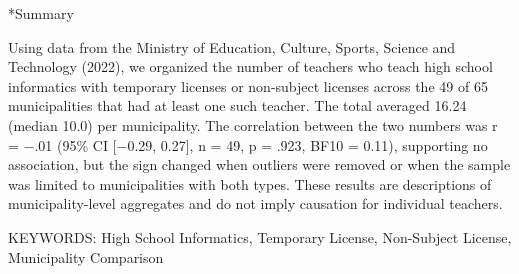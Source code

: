 \documentclass[a4paper,10pt,twocolumn]{ltjsarticle}
\makeatletter
\renewcommand{\section}{\@startsection{section}{1}{\z@}{1.1\Cvs \@plus.4\Cdp \@minus.2\Cdp}{.5\Cvs \@plus.2\Cdp}{\normalfont\gtfamily\bfseries\large}}
\makeatother
\begin{document}
\section*{Summary}
{\footnotesize\setlength{\parindent}{0pt}Using data from the Ministry of Education, Culture, Sports, Science and Technology (2022), we organized the number of teachers who teach high school informatics with temporary licenses or non-subject licenses across the 49 of 65 municipalities that had at least one such teacher. The total averaged 16.24 (median 10.0) per municipality. The correlation between the two numbers was r = −.01 (95\% CI [−0.29, 0.27], n = 49, p = .923, BF10 = 0.11), supporting no association, but the sign changed when outliers were removed or when the sample was limited to municipalities with both types. These results are descriptions of municipality-level aggregates and do not imply causation for individual teachers.\par\smallskip KEYWORDS: High School Informatics, Temporary License, Non-Subject License, Municipality Comparison\par}
\medskip\noindent{}
\end{document}
